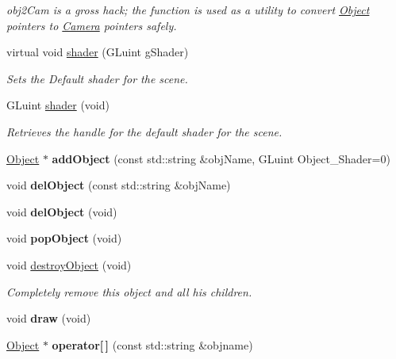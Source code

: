 \begin{DoxyCompactItemize}
\begin{DoxyCompactList}\small\item\em obj2\-Cam is a gross hack; the function is used as a utility to convert \hyperlink{class_object}{Object} pointers to \hyperlink{class_camera}{Camera} pointers safely. \end{DoxyCompactList}\item 
virtual void \hyperlink{class_scene_a3ea7e92935755c776c235a9872f53394}{shader} (G\-Luint g\-Shader)
\begin{DoxyCompactList}\small\item\em Sets the Default shader for the scene. \end{DoxyCompactList}\item 
G\-Luint \hyperlink{class_scene_a9d8a33f0f0a296aba0fb6717ab85cb18}{shader} (void)
\begin{DoxyCompactList}\small\item\em Retrieves the handle for the default shader for the scene. \end{DoxyCompactList}\item 
\hypertarget{class_scene_aa5a48614e959c38c35d824fa9d6a4b8b}{\hyperlink{class_object}{Object} $\ast$ {\bfseries add\-Object} (const std\-::string \&obj\-Name, G\-Luint Object\-\_\-\-Shader=0)}\label{class_scene_aa5a48614e959c38c35d824fa9d6a4b8b}

\item 
\hypertarget{class_scene_a2a6845dacbb468c5c097c7a6ab5a0fe0}{void {\bfseries del\-Object} (const std\-::string \&obj\-Name)}\label{class_scene_a2a6845dacbb468c5c097c7a6ab5a0fe0}

\item 
\hypertarget{class_scene_a2e6b319b60e27e66ad43bb942a6c4424}{void {\bfseries del\-Object} (void)}\label{class_scene_a2e6b319b60e27e66ad43bb942a6c4424}

\item 
\hypertarget{class_scene_ad6c9d1d1d0c786d39bf97dc60410e28b}{void {\bfseries pop\-Object} (void)}\label{class_scene_ad6c9d1d1d0c786d39bf97dc60410e28b}

\item 
\hypertarget{class_scene_a8c57e1cebc39586c7928225d1e25de39}{void \hyperlink{class_scene_a8c57e1cebc39586c7928225d1e25de39}{destroy\-Object} (void)}\label{class_scene_a8c57e1cebc39586c7928225d1e25de39}

\begin{DoxyCompactList}\small\item\em Completely remove this object and all his children. \end{DoxyCompactList}\item 
\hypertarget{class_scene_a41fbbe388ea322df338648e66611ffcf}{void {\bfseries draw} (void)}\label{class_scene_a41fbbe388ea322df338648e66611ffcf}

\item 
\hypertarget{class_scene_ae9b69d8db8a46991017635f22e45baad}{\hyperlink{class_object}{Object} $\ast$ {\bfseries operator\mbox{[}$\,$\mbox{]}} (const std\-::string \&objname)}\label{class_scene_ae9b69d8db8a46991017635f22e45baad}

\end{DoxyCompactItemize}
